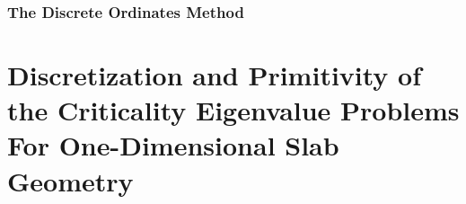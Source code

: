 \subsubsection{The Discrete Ordinates Method}

%

\section{Discretization and Primitivity of the Criticality Eigenvalue Problems For One-Dimensional Slab Geometry}

\label{Discrete}



